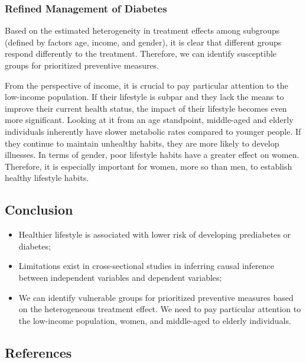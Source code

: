 \documentclass[
  12pt,
]{article}
\providecommand{\tightlist}{%
  \setlength{\itemsep}{0pt}\setlength{\parskip}{0pt}}
\begin{document}
\hypertarget{refined-management-of-diabetes}{%
\subsubsection{Refined Management of
Diabetes}\label{refined-management-of-diabetes}}

Based on the estimated heterogeneity in treatment effects among
subgroups (defined by factors age, income, and gender), it is clear that
different groups respond differently to the treatment. Therefore, we can
identify susceptible groups for prioritized preventive measures.

From the perspective of income, it is crucial to pay particular
attention to the low-income population. If their lifestyle is subpar and
they lack the means to improve their current health status, the impact
of their lifestyle becomes even more significant. Looking at it from an
age standpoint, middle-aged and elderly individuals inherently have
slower metabolic rates compared to younger people. If they continue to
maintain unhealthy habits, they are more likely to develop illnesses. In
terms of gender, poor lifestyle habits have a greater effect on women.
Therefore, it is especially important for women, more so than men, to
establish healthy lifestyle habits.

\hypertarget{conclusion}{%
\subsection{Conclusion}\label{conclusion}}

\begin{itemize}
\tightlist
\item
  Healthier lifestyle is associated with lower risk of developing
  prediabetes or diabetes;
\item
  Limitations exist in cross-sectional studies in inferring causal
  inference between independent variables and dependent variables;
\item
  We can identify vulnerable groups for prioritized preventive measures
  based on the heterogeneous treatment effect. We need to pay particular
  attention to the low-income population, women, and middle-aged to
  elderly individuals.
\end{itemize}

\hypertarget{references}{%
\subsection{References}\label{references}}
\end{document}
